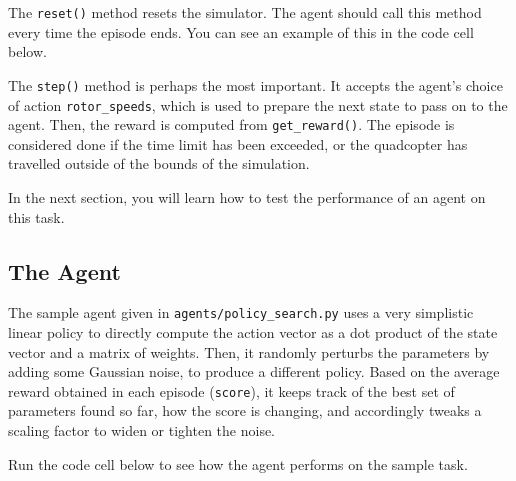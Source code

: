 \documentclass[11pt]{article}
\begin{document}
The \texttt{reset()} method resets the simulator. The agent should call
this method every time the episode ends. You can see an example of this
in the code cell below.

The \texttt{step()} method is perhaps the most important. It accepts the
agent's choice of action \texttt{rotor\_speeds}, which is used to
prepare the next state to pass on to the agent. Then, the reward is
computed from \texttt{get\_reward()}. The episode is considered done if
the time limit has been exceeded, or the quadcopter has travelled
outside of the bounds of the simulation.

In the next section, you will learn how to test the performance of an
agent on this task.

    \hypertarget{the-agent}{%
\subsection{The Agent}\label{the-agent}}

The sample agent given in \texttt{agents/policy\_search.py} uses a very
simplistic linear policy to directly compute the action vector as a dot
product of the state vector and a matrix of weights. Then, it randomly
perturbs the parameters by adding some Gaussian noise, to produce a
different policy. Based on the average reward obtained in each episode
(\texttt{score}), it keeps track of the best set of parameters found so
far, how the score is changing, and accordingly tweaks a scaling factor
to widen or tighten the noise.

Run the code cell below to see how the agent performs on the sample
task.
\end{document}
